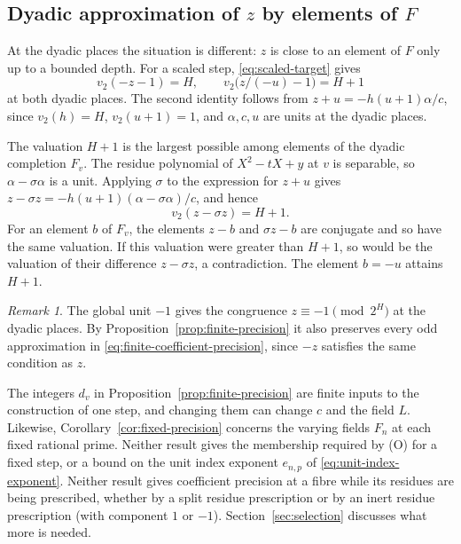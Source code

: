 \documentclass[11pt]{article}
\theoremstyle{plain}
\theoremstyle{definition}
\theoremstyle{remark}
\newtheorem{remark}[theorem]{Remark}
\begin{document}
\subsection{Dyadic approximation of \texorpdfstring{$z$}{z} by elements of \texorpdfstring{$F$}{F}}\label{sec:app-dyadic}

At the dyadic places the situation is different: $z$ is close to an
element of $F$ only up to a bounded depth.  For a scaled step,
\eqref{eq:scaled-target} gives
\begin{equation}\label{eq:dyadic-scalar-depth}
 v_2(-z-1)=H,\qquad
 v_2\bigl(z/(-u)-1\bigr)=H+1
\end{equation}
at both dyadic places.  The second identity follows from
$z+u=-h(u+1)\alpha/c$, since $v_2(h)=H$, $v_2(u+1)=1$, and $\alpha,c,u$
are units at the dyadic places.

The valuation $H+1$ is the largest possible among elements of the dyadic
completion $F_v$.  The residue polynomial of $X^2-tX+y$ at $v$ is
separable, so $\alpha-\sigma\alpha$ is a unit.  Applying $\sigma$ to the
expression for $z+u$ gives $z-\sigma z=-h(u+1)(\alpha-\sigma\alpha)/c$,
and hence
\[
 v_2(z-\sigma z)=H+1.
\]
For an element $b$ of $F_v$, the elements $z-b$ and $\sigma z-b$ are
conjugate and so have the same valuation.  If this valuation were
greater than $H+1$, so would be the valuation of their difference
$z-\sigma z$, a contradiction.  The element $b=-u$ attains $H+1$.

\begin{remark}\label{rem:precision-scope}
The global unit $-1$ gives the congruence $z\equiv-1\pmod{2^H}$ at the
dyadic places.  By Proposition~\ref{prop:finite-precision} it also
preserves every odd approximation in
\eqref{eq:finite-coefficient-precision}, since $-z$ satisfies the same
condition as $z$.

The integers $d_v$ in Proposition~\ref{prop:finite-precision} are finite
inputs to the construction of one step, and changing them can change $c$
and the field $L$.  Likewise, Corollary~\ref{cor:fixed-precision}
concerns the varying fields $F_n$ at each fixed rational prime.  Neither
result gives the membership required by (O) for a fixed step, or a bound
on the unit index exponent $e_{n,p}$ of \eqref{eq:unit-index-exponent}.  Neither
result gives coefficient precision at a fibre while its residues are
being prescribed, whether by a split residue prescription or by an
inert residue prescription (with component $1$ or $-1$).  Section~\ref{sec:selection} discusses
what more is needed.
\end{remark}
\end{document}
